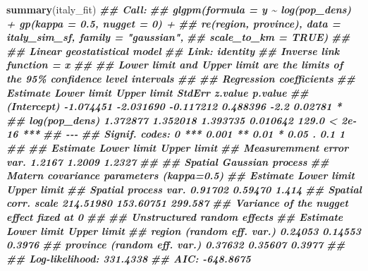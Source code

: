 \documentclass[
  letterpaper,
]{krantz}
\newenvironment{Shaded}{\begin{snugshade}}{\end{snugshade}}
\newcommand{\DocumentationTok}[1]{\textcolor[rgb]{0.56,0.35,0.01}{\textbf{\textit{#1}}}}
\newcommand{\FunctionTok}[1]{\textcolor[rgb]{0.13,0.29,0.53}{\textbf{#1}}}
\newcommand{\NormalTok}[1]{#1}
\begin{document}
\begin{Shaded}
\begin{Highlighting}[]
\FunctionTok{summary}\NormalTok{(italy\_fit)}
\DocumentationTok{\#\# Call:}
\DocumentationTok{\#\# glgpm(formula = y \textasciitilde{} log(pop\_dens) + gp(kappa = 0.5, nugget = 0) + }
\DocumentationTok{\#\#     re(region, province), data = italy\_sim\_sf, family = "gaussian", }
\DocumentationTok{\#\#     scale\_to\_km = TRUE)}
\DocumentationTok{\#\# }
\DocumentationTok{\#\# Linear geostatistical model}
\DocumentationTok{\#\# Link: identity }
\DocumentationTok{\#\# Inverse link function = x }
\DocumentationTok{\#\#  }
\DocumentationTok{\#\# \textquotesingle{}Lower limit\textquotesingle{} and \textquotesingle{}Upper limit\textquotesingle{} are the limits of the 95\% confidence level intervals}
\DocumentationTok{\#\# }
\DocumentationTok{\#\# Regression coefficients}
\DocumentationTok{\#\#                Estimate Lower limit Upper limit    StdErr z.value p.value    }
\DocumentationTok{\#\# (Intercept)   {-}1.074451   {-}2.031690   {-}0.117212  0.488396    {-}2.2 0.02781 *  }
\DocumentationTok{\#\# log(pop\_dens)  1.372877    1.352018    1.393735  0.010642   129.0 \textless{} 2e{-}16 ***}
\DocumentationTok{\#\# {-}{-}{-}}
\DocumentationTok{\#\# Signif. codes:  0 \textquotesingle{}***\textquotesingle{} 0.001 \textquotesingle{}**\textquotesingle{} 0.01 \textquotesingle{}*\textquotesingle{} 0.05 \textquotesingle{}.\textquotesingle{} 0.1 \textquotesingle{} \textquotesingle{} 1}
\DocumentationTok{\#\# }
\DocumentationTok{\#\#                         Estimate Lower limit Upper limit}
\DocumentationTok{\#\# Measuremment error var.   1.2167      1.2009      1.2327}
\DocumentationTok{\#\# }
\DocumentationTok{\#\# Spatial Gaussian process}
\DocumentationTok{\#\# Matern covariance parameters (kappa=0.5)}
\DocumentationTok{\#\#                       Estimate Lower limit Upper limit}
\DocumentationTok{\#\# Spatial process var.   0.91702     0.59470       1.414}
\DocumentationTok{\#\# Spatial corr. scale  214.51980   153.60751     299.587}
\DocumentationTok{\#\# Variance of the nugget effect fixed at 0}
\DocumentationTok{\#\# }
\DocumentationTok{\#\# Unstructured random effects}
\DocumentationTok{\#\#                             Estimate Lower limit Upper limit}
\DocumentationTok{\#\# region (random eff. var.)    0.24053     0.14553      0.3976}
\DocumentationTok{\#\# province (random eff. var.)  0.37632     0.35607      0.3977}
\DocumentationTok{\#\# }
\DocumentationTok{\#\# Log{-}likelihood: 331.4338}
\DocumentationTok{\#\# AIC: {-}648.8675}
\end{Highlighting}
\end{Shaded}
\end{document}
